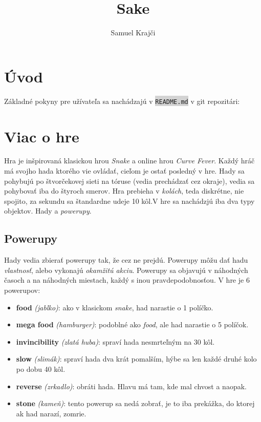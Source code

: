 \documentclass{article}
\title{Sake}
\author{Samuel Krajči}
\date{}
\newcommand{\code}[1]{\colorbox{lightgray}{\lstinline{#1}}}
\begin{document}
\maketitle

\section{Úvod}

Základné pokyny pre užívateľa sa nachádzajú v \code{README.md} v git repozitári:

\bigskip

\begin{tcolorbox}

\end{tcolorbox}

\pagebreak
\section{Viac o hre}

Hra je inšpirovaná klasickou hrou \textit{Snake} a online hrou \textit{Curve Fever}. Každý hráč má svojho hada ktorého vie ovládať, cieľom je ostať posledný v hre. Hady sa pohybujú po štvorčekovej sieti na tóruse (vedia prechádzať cez okraje), vedia sa pohybovať iba do štyroch smerov. Hra prebieha v \textit{kolách}, teda diskrétne, nie spojito, za sekundu sa štandardne udeje 10 kôl.V hre sa nachádzjú iba dva typy objektov. Hady a \textit{powerupy}. 

\subsection{Powerupy}
Hady vedia zbierať powerupy tak, že cez ne prejdú. Powerupy môžu dať hadu \textit{vlastnosť}, alebo vykonajú \textit{okamžitú akciu}. Powerupy sa objavujú v náhodných časoch a na náhodných miestach, každý s inou pravdepodobnosťou. V hre je 6 powerupov:

\begin{itemize}
    \item \textbf{food} \textit{(jablko)}: ako v klasickom \textit{snake}, had narastie o 1 políčko.
    \item \textbf{mega food} \textit{(hamburger)}: podoblné ako \textit{food}, ale had narastie o 5 políčok.
    \item \textbf{invincibility} \textit{(zlatá huba)}: spraví hada nesmrteľným na 30 kôl.
    \item \textbf{slow} \textit{(slimák)}: spraví hada dva krát pomalším, hýbe sa len každé druhé kolo po dobu 40 kôl.
    \item \textbf{reverse} \textit{(zrkadlo)}: obráti hada. Hlavu má tam, kde mal chvost a naopak. 
    \item \textbf{stone} \textit{(kameň)}: tento powerup sa nedá zobrať, je to iba prekážka, do ktorej ak had narazí, zomrie.
\end{itemize}
\end{document}
